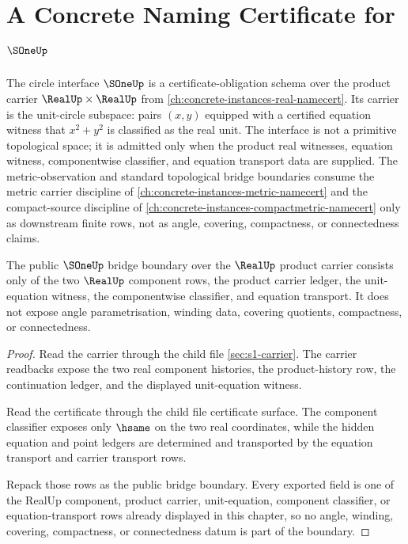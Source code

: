 \chapter{A Concrete Naming Certificate for \(\SOneUp\)}
\label{ch:concrete-instances-s1-namecert}

The circle interface $\SOneUp$ is a certificate-obligation schema over the product carrier $\RealUp \times \RealUp$ from \autoref{ch:concrete-instances-real-namecert}. Its carrier is the unit-circle subspace: pairs $(x,y)$ equipped with a certified equation witness that $x^2 + y^2$ is classified as the real unit. The interface is not a primitive topological space; it is admitted only when the product real witnesses, equation witness, componentwise classifier, and equation transport data are supplied. The metric-observation and standard topological bridge boundaries consume the metric carrier discipline of \autoref{ch:concrete-instances-metric-namecert} and the compact-source discipline of \autoref{ch:concrete-instances-compactmetric-namecert} only as downstream finite rows, not as angle, covering, compactness, or connectedness claims.




\begin{theorem}
\label{thm:sone-real-metric-bridge-boundary}
The public $\SOneUp$ bridge boundary over the $\RealUp$ product carrier
consists only of the two $\RealUp$ component rows, the product carrier ledger,
the unit-equation witness, the componentwise classifier, and equation
transport. It does not expose angle parametrisation, winding data, covering
quotients, compactness, or connectedness.
\end{theorem}
\begin{proof}
Read the carrier through the child file
\autoref{sec:s1-carrier}. The carrier readbacks expose the two real component
histories, the product-history row, the continuation ledger, and the displayed
unit-equation witness.

Read the certificate through the child file certificate surface. The component
classifier exposes only $\hsame$ on the two real coordinates, while the hidden
equation and point ledgers are determined and transported by the equation
transport and carrier transport rows.

Repack those rows as the public bridge boundary. Every exported field is one
of the RealUp component, product carrier, unit-equation, component classifier,
or equation-transport rows already displayed in this chapter, so no angle,
winding, covering, compactness, or connectedness datum is part of the boundary.
\end{proof}

